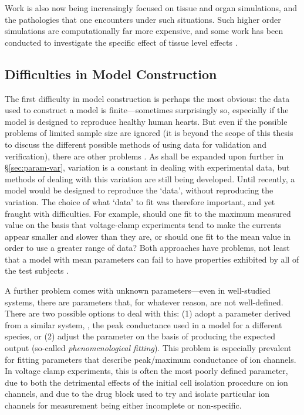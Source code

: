 \documentclass[../thesis-main.tex]{subfiles}
\begin{document}
 Work is also now being increasingly focused on tissue and organ simulations, and the pathologies that one encounters under such situations. Such higher order simulations are computationally far more expensive, and some work has been conducted to investigate the specific effect of tissue level effects \citep{Viswanathan2000}.
 
 \subsection{Difficulties in Model Construction}
 \label{subsec:model-difficulties}
 The first difficulty in model construction is perhaps the most obvious: the data used to construct a model is finite---sometimes surprisingly so, especially if the model is designed to reproduce healthy human hearts. But even if the possible problems of limited sample size are ignored (it is beyond the scope of this thesis to discuss the different possible methods of using data for validation and verification), there are other problems \citep{Marder2011}. As shall be expanded upon further in \S\ref{sec:param-var}, variation is a constant in dealing with experimental data, but methods of dealing with this variation are still being developed. Until recently, a model would be designed to reproduce the `data', without reproducing the variation. The choice of what `data' to fit was therefore important, and yet fraught with difficulties. For example, should one fit to the maximum measured value on the basis that voltage-clamp experiments tend to make the currents appear smaller and slower than they are, or should one fit to the mean value in order to use a greater range of data? Both approaches have problems, not least that a model with mean parameters can fail to have properties exhibited by all of the test subjects \citep{Golowasch2002, Marder2011}.
 
 A further problem comes with unknown parameters---even in well-studied systems, there are parameters that, for whatever reason, are not well-defined. There are two possible options to deal with this: (1) adopt a parameter derived from a similar system, \eg, the peak conductance used in a model for a different species, or (2) adjust the parameter on the basis of producing the expected output (so-called \emph{phenomenological fitting}). This problem is especially prevalent for fitting parameters that describe peak/maximum conductance of ion channels. In voltage clamp experiments, this is often the most poorly defined parameter, due to both the detrimental effects of the initial cell isolation procedure on ion channels, and due to the drug block used to try and isolate particular ion channels for measurement being either incomplete or non-specific.
 
\end{document}
